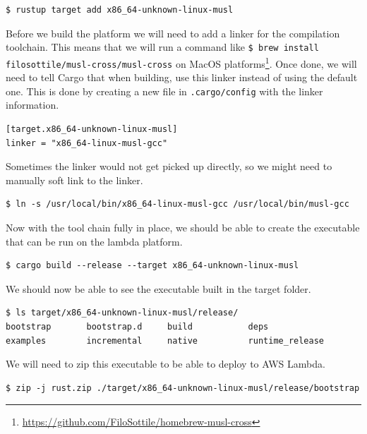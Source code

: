 \documentclass{book}
\begin{document}
\begin{lstlisting}[caption={bash}, basicstyle=\small]
$ rustup target add x86_64-unknown-linux-musl
\end{lstlisting}

Before we build the platform we will need to add a linker for the compilation toolchain. This means that we will run a command like \lstinline{$ brew install filosottile/musl-cross/musl-cross} on MacOS platforms\footnote{\href{}{https://github.com/FiloSottile/homebrew-musl-cross}}. Once done, we will need to tell Cargo that when building, use this linker instead of using the default one. This is done by creating a new file in \lstinline{.cargo/config} with the linker information.

\begin{lstlisting}[caption={chapter8/my\_lambda\_function/.cargo/config}, basicstyle=\small]
[target.x86_64-unknown-linux-musl]
linker = "x86_64-linux-musl-gcc"
\end{lstlisting}

Sometimes the linker would not get picked up directly, so we might need to manually soft link to the linker.

\begin{lstlisting}[caption={bash}, basicstyle=\small]
$ ln -s /usr/local/bin/x86_64-linux-musl-gcc /usr/local/bin/musl-gcc
\end{lstlisting}

Now with the tool chain fully in place, we should be able to create the executable that can be run on the lambda platform.

\begin{lstlisting}[caption={bash}, basicstyle=\small]
$ cargo build --release --target x86_64-unknown-linux-musl
\end{lstlisting}

We should now be able to see the executable built in the target folder.

\begin{lstlisting}[caption={bash}, basicstyle=\small]
$ ls target/x86_64-unknown-linux-musl/release/
bootstrap       bootstrap.d     build           deps            examples        incremental     native          runtime_release
\end{lstlisting}

We will need to zip this executable to be able to deploy to AWS Lambda.

\begin{lstlisting}[caption={bash}, basicstyle=\small]
$ zip -j rust.zip ./target/x86_64-unknown-linux-musl/release/bootstrap
\end{lstlisting}
\end{document}

